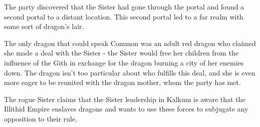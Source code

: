 The party discovered that the Sister had gone through the portal and found a second portal to a distant location.
This second portal led to a far realm with some sort of dragon's lair.

The only dragon that could speak Common was an adult red dragon who claimed she made a deal with the Sister - the Sister would free her children from the influence of the Gith in exchange for the dragon burning a city of her enemies down.
The dragon isn't too particular about who fulfills this deal, and she is even more eager to be reunited with the dragon mother, whom the party has met.

The rogue Sister claims that the Sister leadership in Kalkum is aware that the Illithid Empire enslaves dragons and wants to use these forces to subjugate any opposition to their rule.
